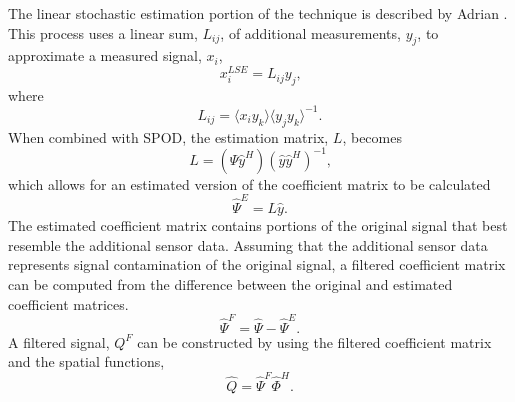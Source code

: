 The linear stochastic estimation portion of the technique is described by Adrian \cite{Adrian-1975-VenaZyuv}.
This process uses a linear sum, $L_{ij}$, of additional measurements, $y_j$, to approximate a measured signal, $x_i$,
\begin{equation}
  x_i^{LSE}=L_{ij}y_j \textrm{,}
  \label{eqn:07_lse_01}
\end{equation}
where
\begin{equation}
  L_{ij} = \langle x_iy_k\rangle\langle y_jy_k\rangle^{-1} \textrm{.}
  \label{eqn:07_lse_02}
\end{equation}
When combined with SPOD, the estimation matrix, $L$, becomes
\begin{equation}
  L=(\hat{\Psi}\hat{y}^H)(\hat{y}\hat{y}^H)^{-1} \textrm{,}
  \label{eqn:07_lse_spod_01}
\end{equation}
which allows for an estimated version of the coefficient matrix to be calculated
\begin{equation}
  \hat{\Psi}^E=L\hat{y} \textrm{.}
  \label{eqn:07_lse_spod_02}
\end{equation}
The estimated coefficient matrix contains portions of the original signal that best resemble the additional sensor data.
Assuming that the additional sensor data represents signal contamination of the original signal, a filtered coefficient matrix can be computed from the difference between the original and estimated coefficient matrices.
\begin{equation}
  \hat{\Psi}^F=\hat{\Psi}-\hat{\Psi}^E \textrm{.}
  \label{eqn:07_lse_spod_03}
\end{equation}
A filtered signal, $Q^F$ can be constructed by using the filtered coefficient matrix and the spatial functions,
\begin{equation}
  \hat{Q} = \hat{\Psi}^F\hat{\Phi}^H \textrm{.}
\end{equation}

